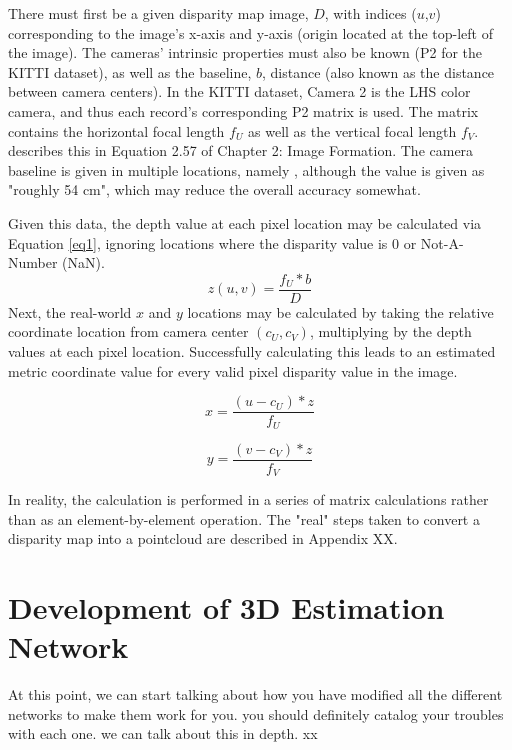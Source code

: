 There must first be a given disparity map image, $D$, with indices ($u$,$v$) corresponding to the image's x-axis and y-axis (origin located at the top-left of the image). The cameras' intrinsic properties must also be known (P2 for the KITTI dataset), as well as the baseline, $b$, distance (also known as the distance between camera centers). In the KITTI dataset, Camera 2 is the LHS color camera, and thus each record's corresponding P2 matrix is used. The matrix contains the horizontal focal length $f_U$ as well as the vertical focal length $f_V$. \cite{szeliski_computer_2010} describes this in Equation 2.57 of Chapter 2: Image Formation. The camera baseline is given in multiple locations, namely \cite{geiger_are_2012}, although the value is given as "roughly 54 cm", which may reduce the overall accuracy somewhat.

Given this data, the depth value at each pixel location may be calculated via Equation \ref{eq1}, ignoring locations where the disparity value is 0 or Not-A-Number (NaN).
\begin{equation}
z(u,v) = \frac{f_U * b}{D}
\label{eq1}
\end{equation}
Next, the real-world $x$ and $y$ locations may be calculated by taking the relative coordinate location from camera center $(c_U,c_V)$, multiplying by the depth values at each pixel location. Successfully calculating this leads to an estimated metric coordinate value for every valid pixel disparity value in the image.

\begin{equation}
x = \frac{(u - c_U) * z}{f_U}
\end{equation}

\begin{equation}
y = \frac{(v - c_V) * z}{f_V}
\end{equation}

In reality, the calculation is performed in a series of matrix calculations rather than as an element-by-element operation. The "real" steps taken to convert a disparity map into a pointcloud are described in Appendix XX.


\section{Development of 3D Estimation Network}
At this point, we can start talking about how you have modified all the different networks to make them work for you. you should definitely catalog your troubles with each one. we can talk about this in depth. xx

